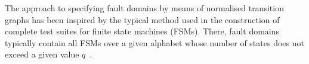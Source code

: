\documentclass[3p,times]{elsarticle}
\begin{document}
The approach  to specifying fault domains by means of normalised transition
graphs has been inspired by the typical method used in the construction of
complete test suites for finite state machines (FSMs). There, fault domains
typically contain all FSMs over a given alphabet whose number of states does
not exceed a given value
$q$~\cite{chow:wmethod,vasilevskii1973,luo_test_1994}.

%
%
\end{document}
